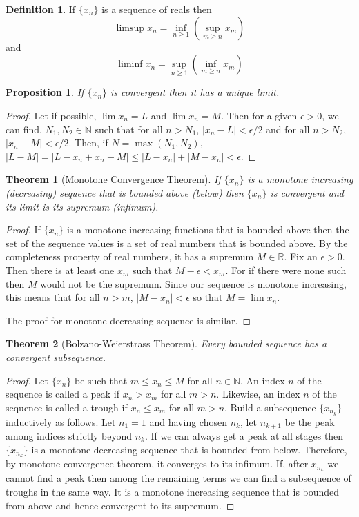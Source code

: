 \documentclass{article}
\theoremstyle{plain}
\newtheorem{thm}{Theorem}
\numberwithin{thm}{section}
\theoremstyle{plain}
\newtheorem{prop}{Proposition}
\numberwithin{prop}{section}
\theoremstyle{definition}
\newtheorem{defn}{Definition}
\numberwithin{defn}{section}
\theoremstyle{remark}
\numberwithin{equation}{section}
\begin{document}
\begin{defn}\label{s1d9}
If $\{x_n\}$ is a sequence of reals then
\[
\limsup x_n = \inf_{n \ge 1}(\sup_{m \ge n} x_m)
\]
and
\[
\liminf x_n = \sup_{n \ge 1}(\inf_{m \ge n} x_m)
\]
\end{defn}

\begin{prop}\label{s1p1}
If $\{x_n\}$ is convergent then it has a unique limit.
\end{prop}
\begin{proof}
Let if possible, $\lim x_n = L$ and $\lim x_n = M$. Then for a given $\epsilon
> 0$, we can find, $N_1, N_2 \in \mathbb{N}$ such that for all $n > N_1$, 
$|x_n - L| < \epsilon/2$ and for all $n > N_2$, $|x_n - M| < \epsilon/2$. Then, 
if $N = \max(N_1, N_2)$, $|L - M| = |L - x_n + x_n - M| \le |L - x_n| + 
|M - x_n| < \epsilon$.
\end{proof}

\begin{thm}[Monotone Convergence Theorem]\label{s1t1}
If $\{x_n\}$ is a monotone increasing (decreasing) sequence that is bounded
above (below) then $\{x_n\}$ is convergent and its limit is its supremum 
(infimum).
\end{thm}
\begin{proof}
If $\{x_n\}$ is a monotone increasing functions that is bounded above then the
set of the sequence values is a set of real numbers that is bounded above. By 
the completeness property of real numbers, it has a supremum $M \in \mathbb{R}$.
Fix an $\epsilon > 0$. Then there is at least one $x_m$ such that $M - \epsilon
< x_m$. For if there were none such then $M$ would not be the supremum. Since
our sequence is monotone increasing, this means that for all $n > m$, $|M - x_n|
< \epsilon$ so that $M = \lim x_n$.

The proof for monotone decreasing sequence is similar.
\end{proof}

\begin{thm}[Bolzano-Weierstrass Theorem]\label{s1t2}
Every bounded sequence has a convergent subsequence.
\end{thm}
\begin{proof}
Let $\{x_n\}$ be such that $m \le x_n \le M$ for all $n \in \mathbb{N}$. An 
index $n$ of the sequence is called a peak if $x_n > x_m$ for all $m > n$. 
Likewise, an index $n$ of the sequence is called a trough if $x_n \le x_m$
for all $m > n$. Build a subsequence $\{x_{n_k}\}$ inductively as follows. Let 
$n_1 = 1$ and having chosen $n_k$, let $n_{k+1}$ be the peak among indices 
strictly beyond $n_k$. If we can always get a peak at all stages then 
$\{x_{n_k}\}$ is a monotone decreasing sequence that is bounded from below. 
Therefore, by monotone convergence theorem, it converges to its infimum. If, 
after $x_{n_k}$ we cannot find a peak then among the remaining terms we can find
a subsequence of troughs in the same way. It is a monotone increasing sequence
that is bounded from above and hence convergent to its supremum.
\end{proof}
\end{document}
